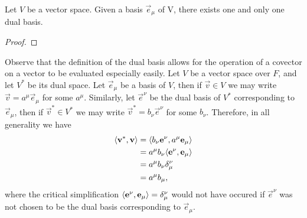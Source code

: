 \documentclass[../main.tex]{subfiles}
\begin{document}
    \begin{theorem}
        Let \(V\) be a vector space. Given a basis \(\vec{e}_{\mu}\) of V, there exists one and only one dual basis.
        \begin{proof}
        \end{proof}
    \end{theorem}
    Observe that the definition of the dual basis allows for the operation of a covector on a vector to be evaluated especially easily. Let \(V\) be a vector space over \(F\), and let \(V^{*}\) be its dual space. Let \(\vec{e}_{\mu}\) be a basis of \(V\), then if \(\vec{v}\in{}V\) we may write \(\vec{v}=a^{\mu}\vec{e}_{\mu}\) for some \(a^{\mu}\). Similarly, let \(\vec{e}^{\nu}\) be the dual basis of \(V^{*}\) corresponding to \(\vec{e}_{\mu}\), then if \(\vec{v}^{*}\in{}V^{*}\) we may write \(\vec{v}^{*}=b_{\nu}\vec{e}^{\nu}\) for some \(b_{\nu}\). Therefore, in all generality we have
    \begin{align*}
        \langle\mathbf{v}^{*},\mathbf{v}\rangle&=\langle b_{\nu}\mathbf{e}^{\nu},a^{\mu}\mathbf{e}_{\mu}\rangle\\
                                  &=a^{\mu}b_{\nu}\langle\mathbf{e}^{\nu},\mathbf{e}_{\mu}\rangle\\
                                  &=a^{\mu}b_{\nu}\delta_{\mu}^{\nu}\\
                                  &=a^{\mu}b_{\mu},
    \end{align*}
    where the critical simplification \(\langle\mathbf{e}^{\nu},\mathbf{e}_{\mu}\rangle=\delta_{\mu}^{\nu}\) would not have occured if \(\vec{e}^{\nu}\) was not chosen to be the dual basis corresponding to \(\vec{e}_{\mu}\).
\end{document}
